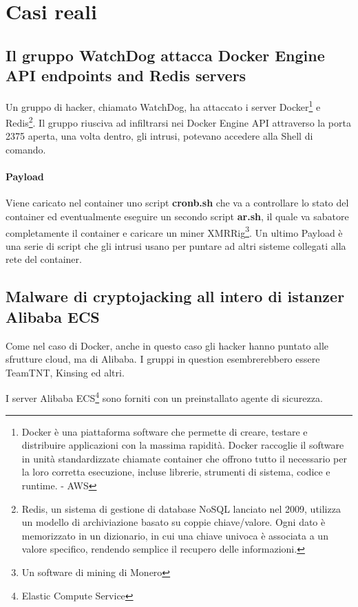 \documentclass[12pt,a4paper]{article}
\begin{document}
\newpage

\section{Casi reali}

\subsection{Il gruppo WatchDog attacca Docker Engine API endpoints and Redis servers}
Un gruppo di hacker, chiamato WatchDog, ha attaccato i server
Docker\footnote{Docker è una piattaforma software che permette di creare,
testare e distribuire applicazioni con la massima rapidità. Docker raccoglie il
software in unità standardizzate chiamate container che offrono tutto il
necessario per la loro corretta esecuzione, incluse librerie, strumenti di
sistema, codice e runtime. - AWS} e Redis\footnote{Redis, un sistema di gestione
di database NoSQL lanciato nel 2009, utilizza un modello di archiviazione basato
su coppie chiave/valore. Ogni dato è memorizzato in un dizionario, in cui una
chiave univoca è associata a un valore specifico, rendendo semplice il recupero
delle informazioni.}. Il gruppo riusciva ad infiltrarsi nei Docker Engine API
attraverso la porta 2375 aperta, una volta dentro, gli intrusi, potevano
accedere alla Shell di comando.

\paragraph{Payload} Viene caricato nel container uno script \textbf{cronb.sh}
che va a controllare lo stato del container ed eventualmente eseguire un secondo
script \textbf{ar.sh}, il quale va sabatore completamente il container e
caricare un miner XMRRig\footnote{Un software di mining di Monero}. Un ultimo
Payload è una serie di script che gli intrusi usano per puntare ad altri sisteme
collegati alla rete del container.\cite{WatchDog}

\subsection{Malware di cryptojacking all intero di istanzer Alibaba ECS}
Come nel caso di Docker, anche in questo caso gli hacker hanno puntato alle
sfrutture cloud, ma di Alibaba. I gruppi in question esembrerebbero essere
TeamTNT, Kinsing ed altri.

I server Alibaba ECS\footnote{Elastic Compute Service} sono forniti con un
preinstallato agente di sicurezza.  
\end{document}
